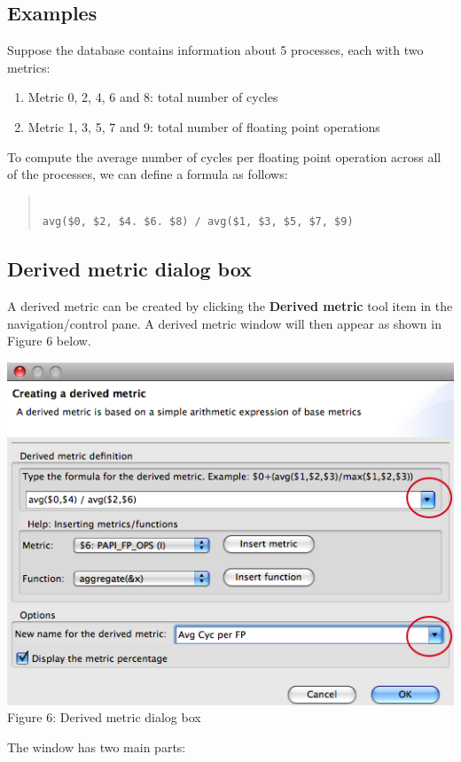 \documentclass[a4paper,11pt]{article}
\begin{document}
\subsection{Examples} Suppose the database contains information about 5 processes, each with two metrics:  
\begin{enumerate}
	\item Metric 0, 2, 4, 6 and 8: total number of cycles
	\item Metric 1, 3, 5, 7 and 9: total number of floating point operations
\end{enumerate} To compute the average number of cycles per floating point operation across all of the processes, we can define a formula as follows: 
\begin{quotation}
\begin{verbatim}

avg($0, $2, $4. $6. $8) / avg($1, $3, $5, $7, $9)
 \end{verbatim}
\end{quotation}

\subsection{Derived metric dialog box}

 A derived metric can be created by clicking the  \textbf{Derived metric} tool item in the navigation/control pane.  A derived metric window will then appear as shown in Figure 6 below.  
\begin{center}

\includegraphics{images/DerivedMetricDlg.png}
\\ Figure 6: Derived metric dialog box 
\end{center}  The window has two main parts:  
\end{document}
